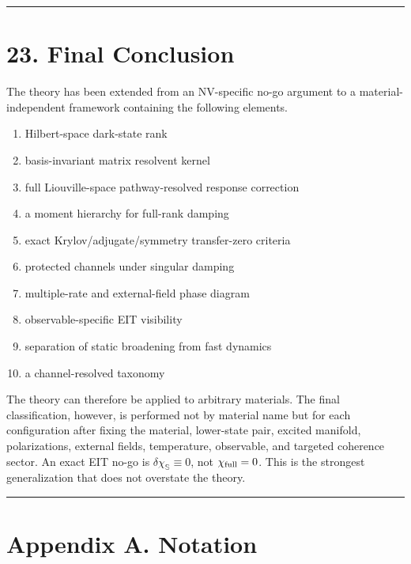 \documentclass[
  10pt,
  a4paper,
]{article}
\providecommand{\tightlist}{%
  \setlength{\itemsep}{0pt}\setlength{\parskip}{0pt}}
\begin{document}
\begin{center}\rule{0.5\linewidth}{0.5pt}\end{center}

\section{23. Final Conclusion}\label{final-conclusion}

The theory has been extended from an NV-specific no-go argument to a
material-independent framework containing the following elements.

\begin{enumerate}
\def\labelenumi{\arabic{enumi}.}
\tightlist
\item
  Hilbert-space dark-state rank
\item
  basis-invariant matrix resolvent kernel
\item
  full Liouville-space pathway-resolved response correction
\item
  a moment hierarchy for full-rank damping
\item
  exact Krylov/adjugate/symmetry transfer-zero criteria
\item
  protected channels under singular damping
\item
  multiple-rate and external-field phase diagram
\item
  observable-specific EIT visibility
\item
  separation of static broadening from fast dynamics
\item
  a channel-resolved taxonomy
\end{enumerate}

The theory can therefore be applied to arbitrary materials. The final
classification, however, is performed not by material name but for each
configuration after fixing the material, lower-state pair, excited
manifold, polarizations, external fields, temperature, observable, and
targeted coherence sector. An exact EIT no-go is
\(\delta\chi_{\mathbb S}\equiv0\), not \(\chi_{\rm full}=0\). This is
the strongest generalization that does not overstate the theory.

\begin{center}\rule{0.5\linewidth}{0.5pt}\end{center}

\section{Appendix A. Notation}\label{appendix-a.-notation}
\end{document}
